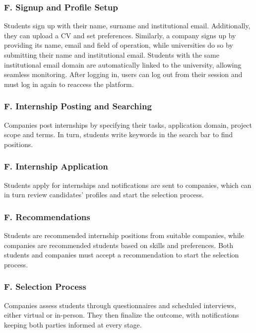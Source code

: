 \setcounter{f}{1}
\newcommand{\fc}{\thef{}}

\subsubsection*{F\fc. Signup and Profile Setup}
Students sign up with their name, surname and institutional email.
Additionally, they can upload a CV and set preferences.
Similarly, a company signs up by providing its name, email and field of operation, while universities do so by submitting their name and institutional email.
Students with the same institutional email domain are automatically linked to the university, allowing seamless monitoring.
After logging in, users can log out from their session and must log in again to reaccess the platform.

\subsubsection*{F\fc. Internship Posting and Searching}
Companies post internships by specifying their tasks, application domain, project scope and terms.
In turn, students write keywords in the search bar to find positions.

\subsubsection*{F\fc. Internship Application}
Students apply for internships and notifications are sent to companies, which can in turn review candidates’ profiles and start the selection process.

\subsubsection*{F\fc. Recommendations}
Students are recommended internship positions from suitable companies, while companies are recommended students based on skills and preferences.
Both students and companies must accept a recommendation to start the selection process.

\subsubsection*{F\fc. Selection Process}
Companies assess students through questionnaires and scheduled interviews, either virtual or in-person.
They then finalize the outcome, with notifications keeping both parties informed at every stage.

